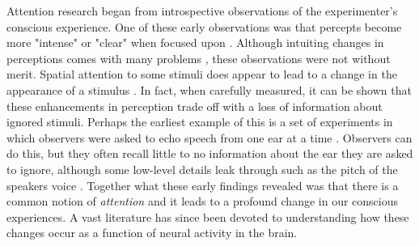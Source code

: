 Attention research began from introspective observations of the experimenter's conscious experience. One of these early observations was that percepts become more "intense" or "clear" when focused upon \citep{Helmholtz1924-rl,James1981-cj,Kuelpe1902-qz,Titchener1908-bx}. Although intuiting changes in perceptions comes with many problems \citep{Helmholtz1924-rl}, these observations were not without merit. Spatial attention to some stimuli does appear to lead to a change in the appearance of a stimulus \citep{Carrasco2018-sb}. In fact, when carefully measured, it can be shown that these enhancements in perception trade off with a loss of information about ignored stimuli. Perhaps the earliest example of this is a set of experiments in which observers were asked to echo speech from one ear at a time \citep{Cherry1953-as}. Observers can do this, but they often recall little to no information about the ear they are asked to ignore, although some low-level details leak through such as the pitch of the speakers voice \citep{Cherry1953-as}. Together what these early findings revealed was that there is a common notion of \textit{attention} and it leads to a profound change in our conscious experiences. A vast literature has since been devoted to understanding how these changes occur as a function of neural activity in the brain. 

